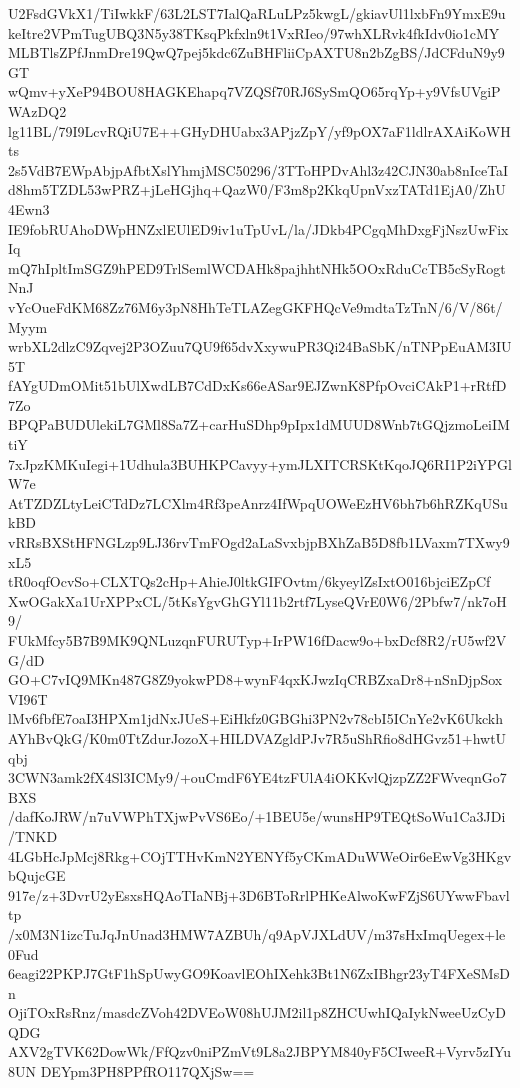U2FsdGVkX1/TiIwkkF/63L2LST7IalQaRLuLPz5kwgL/gkiavUl1lxbFn9YmxE9u
keItre2VPmTugUBQ3N5y38TKsqPkfxln9t1VxRIeo/97whXLRvk4fkIdv0io1cMY
MLBTlsZPfJnmDre19QwQ7pej5kdc6ZuBHFliiCpAXTU8n2bZgBS/JdCFduN9y9GT
wQmv+yXeP94BOU8HAGKEhapq7VZQSf70RJ6SySmQO65rqYp+y9VfsUVgiPWAzDQ2
lg11BL/79I9LcvRQiU7E++GHyDHUabx3APjzZpY/yf9pOX7aF1ldlrAXAiKoWHts
2s5VdB7EWpAbjpAfbtXslYhmjMSC50296/3TToHPDvAhl3z42CJN30ab8nIceTaI
d8hm5TZDL53wPRZ+jLeHGjhq+QazW0/F3m8p2KkqUpnVxzTATd1EjA0/ZhU4Ewn3
IE9fobRUAhoDWpHNZxlEUlED9iv1uTpUvL/la/JDkb4PCgqMhDxgFjNszUwFixIq
mQ7hIpltImSGZ9hPED9TrlSemlWCDAHk8pajhhtNHk5OOxRduCcTB5cSyRogtNnJ
vYcOueFdKM68Zz76M6y3pN8HhTeTLAZegGKFHQcVe9mdtaTzTnN/6/V/86t/Myym
wrbXL2dlzC9Zqvej2P3OZuu7QU9f65dvXxywuPR3Qi24BaSbK/nTNPpEuAM3IU5T
fAYgUDmOMit51bUlXwdLB7CdDxKs66eASar9EJZwnK8PfpOvciCAkP1+rRtfD7Zo
BPQPaBUDUlekiL7GMl8Sa7Z+carHuSDhp9pIpx1dMUUD8Wnb7tGQjzmoLeiIMtiY
7xJpzKMKuIegi+1Udhula3BUHKPCavyy+ymJLXITCRSKtKqoJQ6RI1P2iYPGlW7e
AtTZDZLtyLeiCTdDz7LCXlm4Rf3peAnrz4IfWpqUOWeEzHV6bh7b6hRZKqUSukBD
vRRsBXStHFNGLzp9LJ36rvTmFOgd2aLaSvxbjpBXhZaB5D8fb1LVaxm7TXwy9xL5
tR0oqfOcvSo+CLXTQs2cHp+AhieJ0ltkGIFOvtm/6kyeylZsIxtO016bjciEZpCf
XwOGakXa1UrXPPxCL/5tKsYgvGhGYl11b2rtf7LyseQVrE0W6/2Pbfw7/nk7oH9/
FUkMfcy5B7B9MK9QNLuzqnFURUTyp+IrPW16fDacw9o+bxDcf8R2/rU5wf2VG/dD
GO+C7vIQ9MKn487G8Z9yokwPD8+wynF4qxKJwzIqCRBZxaDr8+nSnDjpSoxVI96T
lMv6fbfE7oaI3HPXm1jdNxJUeS+EiHkfz0GBGhi3PN2v78cbI5ICnYe2vK6Ukckh
AYhBvQkG/K0m0TtZdurJozoX+HILDVAZgldPJv7R5uShRfio8dHGvz51+hwtUqbj
3CWN3amk2fX4Sl3ICMy9/+ouCmdF6YE4tzFUlA4iOKKvlQjzpZZ2FWveqnGo7BXS
/dafKoJRW/n7uVWPhTXjwPvVS6Eo/+1BEU5e/wunsHP9TEQtSoWu1Ca3JDi/TNKD
4LGbHcJpMcj8Rkg+COjTTHvKmN2YENYf5yCKmADuWWeOir6eEwVg3HKgvbQujcGE
917e/z+3DvrU2yEsxsHQAoTIaNBj+3D6BToRrlPHKeAlwoKwFZjS6UYwwFbavltp
/x0M3N1izcTuJqJnUnad3HMW7AZBUh/q9ApVJXLdUV/m37sHxImqUegex+le0Fud
6eagi22PKPJ7GtF1hSpUwyGO9KoavlEOhIXehk3Bt1N6ZxIBhgr23yT4FXeSMsDn
OjiTOxRsRnz/masdcZVoh42DVEoW08hUJM2il1p8ZHCUwhIQaIykNweeUzCyDQDG
AXV2gTVK62DowWk/FfQzv0niPZmVt9L8a2JBPYM840yF5CIweeR+Vyrv5zIYu8UN
DEYpm3PH8PPfRO117QXjSw==
